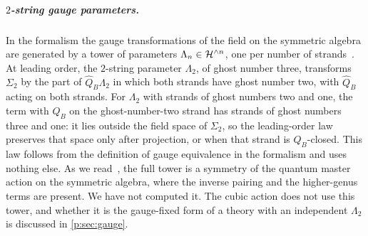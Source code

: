 \subparagraph{$2$-string gauge parameters.}


In the \IBL{} formalism the gauge transformations of the field on the symmetric algebra are generated by a tower of parameters $\Lambda_n \in \mathcal{H}^{\wedge n}$, one per number of strands~\cite[app.~A.2]{Muenster:2014:HomotopyClassificationBosonic}.
At leading order, the $2$-string parameter $\Lambda_2$, of ghost number three, transforms $\Sigma_2$ by the part of $\hat Q_B \Lambda_2$ in which both strands have ghost number two, with $\hat Q_B$ acting on both strands.
  For $\Lambda_2$ with strands of ghost numbers two and one, the term with $Q_B$ on the ghost-number-two strand has strands of ghost numbers three and one: it lies outside the field space of $\Sigma_2$, so the leading-order law preserves that space only after projection, or when that strand is $Q_B$-closed.
  This law follows from the definition of gauge equivalence in the \IBL{} formalism and uses nothing else.
As we read~\cite{Muenster:2013:QuantumOpenClosedHomotopy}, the full tower is a symmetry of the quantum master action on the symmetric algebra, where the inverse pairing and the higher-genus terms are present.
We have not computed it.
The cubic action does not use this tower, and whether it is the gauge-fixed form of a theory with an independent $\Lambda_2$ is discussed in \cref{p:sec:gauge}.

